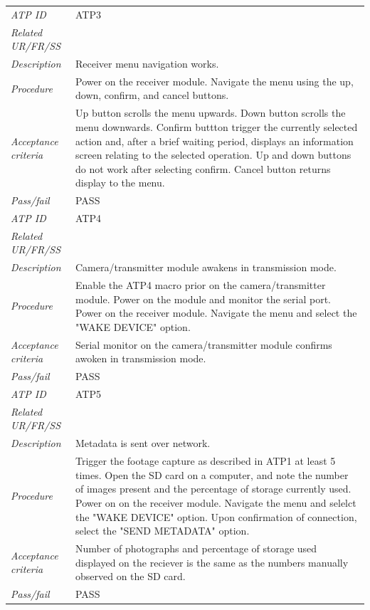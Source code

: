 \documentclass[class=report,11pt,crop=false]{standalone}
\begin{document}
\begin{table}[!ht]
\begin{scriptsize}
\begin{tabularx}{\textwidth}{|p{} X|}
        \textit{ATP ID} & ATP3\\
        \textit{Related UR/FR/SS} &\\
        \textit{Description} & Receiver menu navigation works.\\
        \textit{Procedure} & Power on the receiver module. Navigate the menu using the up, down, confirm, and cancel buttons.\\
        \textit{Acceptance criteria} & Up button scrolls the menu upwards. Down button scrolls the menu downwards. Confirm buttton trigger the currently selected action and, after a brief waiting period, displays an information screen relating to the selected operation. Up and down buttons do not work after selecting confirm. Cancel button returns display to the menu.\\ 
        \textit{Pass/fail} & PASS \\ \hline

        \textit{ATP ID} & ATP4 \\
        \textit{Related UR/FR/SS} & \\
        \textit{Description} & Camera/transmitter module awakens in transmission mode. \\
        \textit{Procedure} &  Enable the ATP4 macro prior on the camera/transmitter module. Power on the module and monitor the serial port. Power on the receiver module. Navigate the menu and select the "WAKE DEVICE" option.\\
        \textit{Acceptance criteria} & Serial monitor on the camera/transmitter module confirms awoken in transmission mode.\\ 
        \textit{Pass/fail} & PASS\\ \hline

        \textit{ATP ID} & ATP5  \\
        \textit{Related UR/FR/SS} &\\
        \textit{Description} & Metadata is sent over network.\\
        \textit{Procedure} & Trigger the footage capture as described in ATP1 at least 5 times. Open the SD card on a computer, and note the number of images present and the percentage of storage currently used. Power on on the receiver module. Navigate the menu and selelct the "WAKE DEVICE" option. Upon confirmation of connection, select the "SEND METADATA" option.\\
        \textit{Acceptance criteria} & Number of photographs and percentage of storage used displayed on the reciever is the same as the numbers manually observed on the SD card. \\ 
        \textit{Pass/fail} & PASS\\ \hline


\end{tabularx}
\end{scriptsize}
\end{table}
\end{document}
